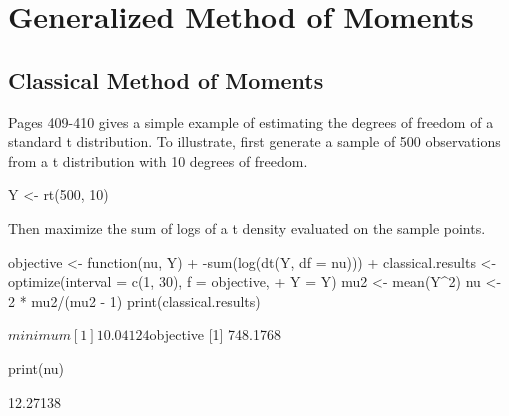 \documentclass[a4paper]{article}
\begin{document}
\section{Generalized Method of Moments}
\subsection{Classical Method of Moments}
Pages 409-410 gives a simple example of estimating the degrees of freedom of a standard t distribution. 
To illustrate, first generate a sample of 500 observations from a t distribution with 10 degrees of freedom.
\begin{Schunk}
\begin{Sinput}
 Y <- rt(500, 10)
\end{Sinput}
\end{Schunk}
Then maximize the sum of logs of a t density evaluated on the sample points.
\begin{Schunk}
\begin{Sinput}
 objective <- function(nu, Y) {
+     -sum(log(dt(Y, df = nu)))
+ }
 classical.results <- optimize(interval = c(1, 30), f = objective, 
+     Y = Y)
 mu2 <- mean(Y^2)
 nu <- 2 * mu2/(mu2 - 1)
 print(classical.results)
\end{Sinput}
\begin{Soutput}
$minimum
[1] 10.04124

$objective
[1] 748.1768
\end{Soutput}
\begin{Sinput}
 print(nu)
\end{Sinput}
\begin{Soutput}
[1] 12.27138
\end{Soutput}
\end{Schunk}
\end{document}
